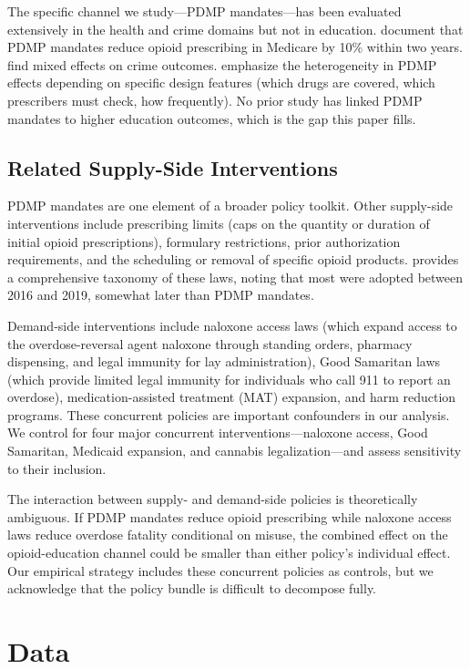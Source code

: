 \documentclass[12pt]{article}
\begin{document}
The specific channel we study---PDMP mandates---has been evaluated extensively in the health and crime domains but not in education. \citet{buchmueller2018effect} document that PDMP mandates reduce opioid prescribing in Medicare by 10\% within two years. \citet{brady2016prescription} find mixed effects on crime outcomes. \citet{horwitz2021association} emphasize the heterogeneity in PDMP effects depending on specific design features (which drugs are covered, which prescribers must check, how frequently). No prior study has linked PDMP mandates to higher education outcomes, which is the gap this paper fills.

\subsection{Related Supply-Side Interventions}

PDMP mandates are one element of a broader policy toolkit. Other supply-side interventions include prescribing limits (caps on the quantity or duration of initial opioid prescriptions), formulary restrictions, prior authorization requirements, and the scheduling or removal of specific opioid products. \citet{davis2019laws} provides a comprehensive taxonomy of these laws, noting that most were adopted between 2016 and 2019, somewhat later than PDMP mandates.

Demand-side interventions include naloxone access laws (which expand access to the overdose-reversal agent naloxone through standing orders, pharmacy dispensing, and legal immunity for lay administration), Good Samaritan laws (which provide limited legal immunity for individuals who call 911 to report an overdose), medication-assisted treatment (MAT) expansion, and harm reduction programs. These concurrent policies are important confounders in our analysis. We control for four major concurrent interventions---naloxone access, Good Samaritan, Medicaid expansion, and cannabis legalization---and assess sensitivity to their inclusion.

The interaction between supply- and demand-side policies is theoretically ambiguous. If PDMP mandates reduce opioid prescribing while naloxone access laws reduce overdose fatality conditional on misuse, the combined effect on the opioid-education channel could be smaller than either policy's individual effect. Our empirical strategy includes these concurrent policies as controls, but we acknowledge that the policy bundle is difficult to decompose fully.


\section{Data}
\end{document}

